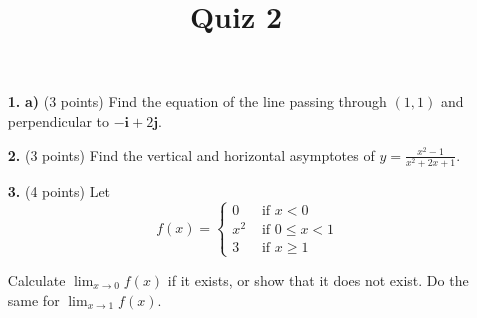 \documentclass[12pt]{amsart}
\title{Quiz 2}
\begin{document}
\maketitle
\thispagestyle{fancy}

\vskip0.25in
\begin{enumerate}


\item[\textbf{1. }]\textbf{a)} (3 points) Find the equation of the line passing through $(1,1)$ and perpendicular to $- \mathbf i +  2 \mathbf j$.

\vskip 2in

\item[\textbf{2. }](3 points) Find the vertical and horizontal asymptotes of $\displaystyle y = \frac {x^2 - 1} {x^2 + 2x + 1}$.
 
\vskip 2in

\item[\textbf{3. }] (4 points) Let 
\[
f(x) = \begin{cases} 
0 & \text{ if } x < 0 
\\ x^2 & \text{ if } 0 \le x < 1
\\ 3 & \text{ if } x \ge 1
\end{cases} 
\]

Calculate $\displaystyle \lim_{x \to 0} f(x)$ if it exists, or show that it does not exist.  Do the same for $\displaystyle \lim_{x \to 1} f(x)$.




\end{enumerate}
\end{document}
